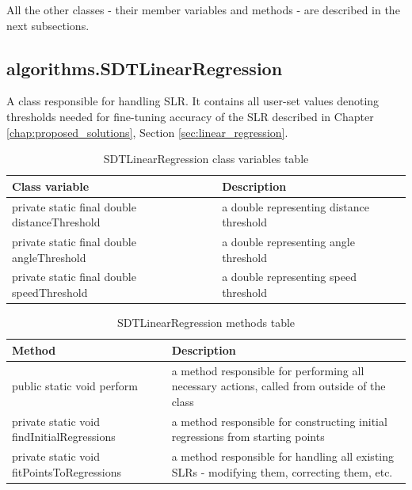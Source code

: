 	All the other classes - their member variables and methods - are described in the next subsections.
	
\newpage
	
\subsection{algorithms.SDTLinearRegression}\label{subsec:slr}

	A class responsible for handling SLR. It contains all user-set values denoting thresholds needed for fine-tuning accuracy of the SLR described in Chapter \ref{chap:proposed_solutions}, Section \ref{sec:linear_regression}.
	
\begin{table}[H]
\centering
\setlength{\extrarowheight}{2pt}
\begin{tabularx}{\textwidth}{|X|X|}
\hline
\textbf{Class variable} & \textbf{Description} \\ \hline
private static final double \mbox{distanceThreshold} & a double representing distance threshold \\ \hline
private static final double \mbox{angleThreshold} & a double representing angle threshold    \\ \hline
private static final double \mbox{speedThreshold} & a double representing speed threshold    \\ \hline
\end{tabularx}
\caption{SDTLinearRegression class variables table}
\label{tab:class_variables_LR}
\end{table}

\begin{table}[H]
\centering
\setlength{\extrarowheight}{2pt}
\begin{tabularx}{\textwidth}{|X|X|}
\hline
\textbf{Method} & \textbf{Description} \\ \hline
public static void \mbox{perform} & a method responsible for performing all necessary actions, called from outside of the class \\ \hline
private static void \mbox{findInitialRegressions} & a method responsible for constructing initial regressions from starting points\\ \hline
private static void \mbox{fitPointsToRegressions} & a method responsible for handling all existing SLRs - modifying them, correcting them, etc.\\ \hline
\end{tabularx}
\caption{SDTLinearRegression methods table}
\label{tab:class_methods_LR}
\end{table}

